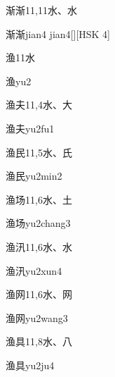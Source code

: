 \begin{Entry}{渐渐}{11,11}{⽔、⽔}
  \begin{Phonetics}{渐渐}{jian4 jian4}[][HSK 4]
  \end{Phonetics}
\end{Entry}

\begin{Entry}{渔}{11}{⽔}
  \begin{Phonetics}{渔}{yu2}
  \end{Phonetics}
\end{Entry}

\begin{Entry}{渔夫}{11,4}{⽔、⼤}
  \begin{Phonetics}{渔夫}{yu2fu1}
  \end{Phonetics}
\end{Entry}

\begin{Entry}{渔民}{11,5}{⽔、⽒}
  \begin{Phonetics}{渔民}{yu2min2}
  \end{Phonetics}
\end{Entry}

\begin{Entry}{渔场}{11,6}{⽔、⼟}
  \begin{Phonetics}{渔场}{yu2chang3}
  \end{Phonetics}
\end{Entry}

\begin{Entry}{渔汛}{11,6}{⽔、⽔}
  \begin{Phonetics}{渔汛}{yu2xun4}
  \end{Phonetics}
\end{Entry}

\begin{Entry}{渔网}{11,6}{⽔、⽹}
  \begin{Phonetics}{渔网}{yu2wang3}
  \end{Phonetics}
\end{Entry}

\begin{Entry}{渔具}{11,8}{⽔、⼋}
  \begin{Phonetics}{渔具}{yu2ju4}
  \end{Phonetics}
\end{Entry}

